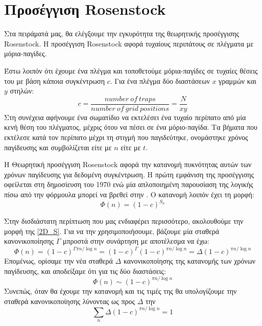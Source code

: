 \section{Προσέγγιση {\en Rosenstock}}
Στα πειράματά μας, θα ελέγξουμε την εγκυρότητα της θεωρητικής προσέγγισης {\en Rosenstock}. H προσέγγιση {\en Rosenstock} αφορά τυχαίους περιπάτους σε πλέγματα με μόρια-παγίδες.

Έστω λοιπόν ότι έχουμε ένα πλέγμα και τοποθετούμε μόρια-παγίδες σε τυχαίες θέσεις του με βάση κάποια συγκέντρωση $c$. Για ένα πλέγμα δύο διαστάσεων $x$ γραμμών και $y$ στηλών: 
\begin{equation}
\label{conc}
c = \frac{number{\ }of{\ }traps}{number{\ }of{\ }grid{\ }positions}=\frac{N}{xy}
\end{equation}
Στη συνέχεια αφήνουμε ένα σωματίδιο να εκτελέσει ένα τυχαίο περίπατο από μία κενή θέση του πλέγματος, μέχρις ότου να πέσει σε ένα μόριο-παγίδα. Τα βήματα που εκτέλεσε κατά τον περίπατο μέχρι τη στιγμή που παγιδεύτηκε, ονομάστηκε χρόνος παγίδευσης και συμβολίζεται είτε με $n$ είτε με $t$. 

Η Θεωρητική προσέγγιση {\en Rosenstock} αφορά την κατανομή πυκνότητας αυτών των χρόνων παγίδευσης για δεδομένη συγκέντρωση. Η πρώτη εμφάνιση της προσέγγισης οφείλεται στη δημοσίευση του 1970 \cite{rosenstock1970random} ενώ μία απλοποιημένη παρουσίαση της λογικής πίσω από την φόρμουλα μπορεί να βρεθεί στην \citep{gallos2001trapping}. Ο κατανομή λοιπόν έχει τη μορφή:
\begin{equation}
\Phi(n) = (1-c)^{S_n}
\end{equation}

Στην δισδιάστατη περίπτωση που μας ενδιαφέρει περισσότερο, ακολουθούμε την μορφή της \eqref{2D_S}. Για να την χρησιμοποιήσουμε, βάζουμε μία σταθερά κανονικοποίησης $\Gamma$ μπροστά στην συνάρτηση με αποτέλεσμα να έχω: 
\begin{equation}
\Phi(n) = (1-c)^{ \Gamma \pi n / \log n}= (1-c)^{ \Gamma}(1-c)^{\pi n / \log n} = \Delta (1-c)^{\pi n / \log n}
\label{Rosenstock}
\end{equation}
Επομένως, ορίσαμε την νέα σταθερά $\Delta$ κανονικοποίησης της κατανομής των χρόνων παγίδευσης, και αποδείξαμε ότι για τις δύο διαστάσεις:
\begin{equation}
\Phi(n) \sim (1-c)^{\pi n / \log n}
\end{equation}
\newpage
\noindent
Συνεπώς, όταν θα έχουμε την κατανομή και τις τιμές της θα υπολογίζουμε την σταθερά κανονικοποίησης λύνοντας ως προς $\Delta$ την
\begin{equation}
\sum_n \Delta (1-c)^{\pi n / \log n} = 1 
\label{norm} 
\end{equation}
